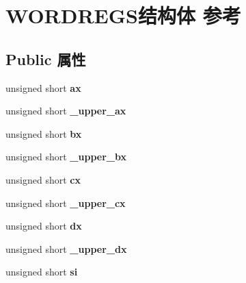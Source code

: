 \hypertarget{struct_w_o_r_d_r_e_g_s}{}\section{W\+O\+R\+D\+R\+E\+G\+S结构体 参考}
\label{struct_w_o_r_d_r_e_g_s}
\subsection*{Public 属性}
\begin{DoxyCompactItemize}
\item 
\mbox{\label{struct_w_o_r_d_r_e_g_s_afd56e504912b6793702d016f1bdab49a}} 
unsigned short {\bfseries ax}
\item 
\mbox{\label{struct_w_o_r_d_r_e_g_s_a969813f7d042eafd3c94c5fe24f71994}} 
unsigned short {\bfseries \+\_\+upper\+\_\+ax}
\item 
\mbox{\label{struct_w_o_r_d_r_e_g_s_acce172aeb6a68669117f910c5b4f41a1}} 
unsigned short {\bfseries bx}
\item 
\mbox{\label{struct_w_o_r_d_r_e_g_s_ae3bb0fd6b3d23d4a8ac682f5636e7eff}} 
unsigned short {\bfseries \+\_\+upper\+\_\+bx}
\item 
\mbox{\label{struct_w_o_r_d_r_e_g_s_a75690f30f183443317dfe3170e0e7cbd}} 
unsigned short {\bfseries cx}
\item 
\mbox{\label{struct_w_o_r_d_r_e_g_s_a23bf3e737cfde50b7c76846ed52c9ea7}} 
unsigned short {\bfseries \+\_\+upper\+\_\+cx}
\item 
\mbox{\label{struct_w_o_r_d_r_e_g_s_abebca562fabcffa0692c10e4b8c92748}} 
unsigned short {\bfseries dx}
\item 
\mbox{\label{struct_w_o_r_d_r_e_g_s_a50613e3847b3356fea42b68c327c39a5}} 
unsigned short {\bfseries \+\_\+upper\+\_\+dx}
\item 
\mbox{\label{struct_w_o_r_d_r_e_g_s_a213772f9a29cec01a141c703e274b8ae}} 
unsigned short {\bfseries si}

\end{DoxyCompactItemize}
